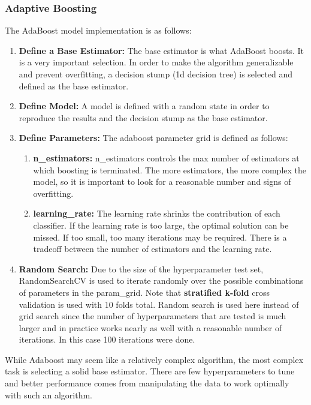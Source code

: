 \documentclass[11pt]{article}
\begin{document}
	\subsubsection{Adaptive Boosting}
		The AdaBoost model implementation is as follows:
		\begin{enumerate}
			\item \textbf{Define a Base Estimator:} The base estimator is what AdaBoost boosts. It is a very important selection. In order to make the algorithm generalizable and prevent overfitting, a decision stump (1d decision tree) is selected and defined as the base estimator.
			\item \textbf{Define Model:} A model is defined with a random state in order to reproduce the results and the decision stump as the base estimator.
			\item \textbf{Define Parameters:} The adaboost parameter grid is defined as follows: 
			\begin{enumerate}
				\item  \textbf{n\_estimators:} n\_estimators controls the max number of estimators at which boosting is terminated. The more estimators, the more complex the model, so it is important to look for a reasonable number and signs of overfitting.
				\item \textbf{learning\_rate:} The learning rate shrinks the contribution of each classifier. If the learning rate is too large, the optimal solution can be missed. If too small, too many iterations may be required. There is a tradeoff between the number of estimators and the learning rate.
			\end{enumerate}
			\item \textbf{Random Search:} Due to the size of the hyperparameter test set, RandomSearchCV is used to iterate randomly over the possible combinations of parameters in the param\_grid. Note that \textbf{stratified k-fold} cross validation is used with 10 folds total. Random search is used here instead of grid search since the number of hyperparameters that are tested is much larger and in practice works nearly as well with a reasonable number of iterations. In this case 100 iterations were done.
		\end{enumerate}	
	
	While Adaboost may seem like a relatively complex algorithm, the most complex task is selecting a solid base estimator. There are few hyperparameters to tune and better performance comes from manipulating the data to work optimally with such an algorithm.
	
\end{document}
